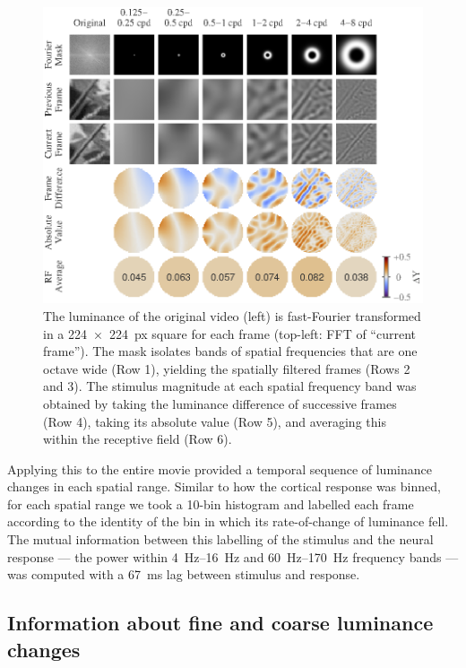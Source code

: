 \begin{figure}[htbp]
\includegraphics[width=1.05\linewidth]{paperfigs/fig4.eps}
%
\caption{
The luminance of the original video (left) is fast-Fourier transformed in a \SI{224x224}{px} square for each frame (top-left: \ac{FFT} of  ``current frame'').
The mask isolates bands of spatial frequencies that are one octave wide (Row 1), yielding the spatially filtered frames (Rows 2 and 3).
The stimulus magnitude at each spatial frequency band was obtained by taking the luminance difference of successive frames (Row 4), taking its absolute value (Row 5), and averaging this within the receptive field (Row 6).
}%
\label{fig:lam_spares_method}
%
\end{figure}

Applying this to the entire movie provided a temporal sequence of luminance changes in each spatial range.
Similar to how the cortical response was binned, for each spatial range we took a \num{10}-bin histogram and labelled each frame according to the identity of the bin in which its rate-of-change of luminance fell.
The mutual information between this labelling of the stimulus and the neural response --- the power within \SIrange{4}{16}{Hz} and \SIrange{60}{170}{Hz} frequency bands --- was computed with a \SI{67}{\milli\second} lag between stimulus and response.


\subsection{Information about fine and coarse luminance changes}

